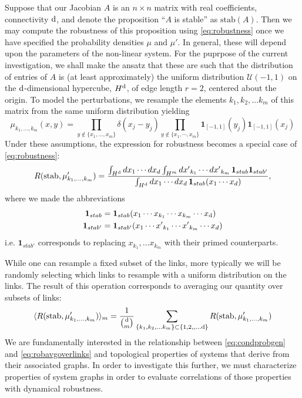 Suppose that our Jacobian $A$ is an $n \times n$ matrix with real coefficients, connectivity $\mathrm{d}$, and denote the proposition ``$A$ is stable'' as $\mathrm{stab}(A)$.  Then we may compute the robustness of this proposition using \ref{eq:robustness} once we have specified the probability densities $\mu$ and $\mu'$.  In general, these will depend upon the parameters of the non-linear system.  For the puprpose of the current investigation, we shall make the ansatz that these are such that the distribution of entries of $A$ is (at least approximately) the uniform distribution $\mathcal{U}(-1,1)$ on the $\mathrm{d}$-dimensional hypercube, $H^{\mathrm{d}}$, of edge length $r=2$, centered about the origin. To model the perturbations, we resample the elements $k_1, k_2, \ldots k_m$ of this matrix from the same uniform distribution yielding
$$
\mu_{k_1,\ldots,k_m}(x,y) = \prod_{y \notin \{x_1, \ldots, x_m\} } \delta(x_j-y_j) \prod_{y \notin \{x_1,\cdots,x_m\}} \mathbf{1}_{[-1,1]} (y_j) \mathbf{1}_{[-1,1]} (x_j)
$$
Under these assumptions, the expression for robustness becomes a special case of \ref{eq:robustness}:
\begin{equation}\label{eq:condprobgen}
 R (\mathrm{stab}, \mu'_{k_1, \ldots, k_m}) =
  \frac{\int_{H^{\mathrm{d}}} dx_1 \cdots dx_d \int_{H^m} {dx'}_{k_1} \cdots {dx'}_{k_m}\,
    \mathbf{1}_{stab} \mathbf{1}_{stab'}}
  {\int_{H^{\mathrm{d}}} dx_1 \cdots dx_d  \, \mathbf{1}_{stab}(x_1 \cdots x_d)},
\end{equation}
where we made the abbreviations
\begin{align*}
\mathbf{1}_{stab} &= \mathbf{1}_{stab}(x_1 \cdots x_{k_1} \cdots x_{k_m} \cdots x_{\mathrm{d}}) \\
\mathbf{1}_{stab'} &= \mathbf{1}_{stab'}(x_1 \cdots {x'}_{k_1} \cdots {x'}_{k_m}  \cdots x_d)
\end{align*}
i.e. $\mathbf{1}_{stab'}$ corresponds to replacing $x_{k_1}, \ldots x_{k_m}$ with their primed counterparts.

While one can resample a fixed subset of the links, more typically we will be randomly selecting which links to resample with a uniform distribution on the links.  The result of this operation corresponds to averaging our quantity over subsets of links:
\begin{equation}\label{eq:robavgoverlinks}
\langle R (\hbox{stab}, \mu'_{k_1, \ldots, k_m}) \rangle_m =
\frac{1}{\binom{\mathrm{d}}{m}}
\sum_{\{k_1, k_2, \ldots k_m\} \subset \{1, 2,, \ldots \mathrm{d}\}}
R (\hbox{stab}, \mu'_{k_1, \ldots, k_m})
\end{equation}
We are fundamentally interested in the relationship between \ref{eq:condprobgen} and \ref{eq:robavgoverlinks} and topological properties of systems that derive from their associated graphs. In order to investigate this further, we must characterize properties of system graphs in order to evaluate correlations of those properties with dynamical robustness.

